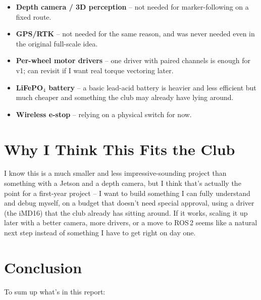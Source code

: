 \documentclass[12pt,a4paper]{article}
\begin{document}
\begin{itemize}
    \item \textbf{Depth camera / 3D perception} -- not needed for marker-following on a
    fixed route.
    \item \textbf{GPS/RTK} -- not needed for the same reason, and was never needed even
    in the original full-scale idea.
    \item \textbf{Per-wheel motor drivers} -- one driver with paired channels is enough
    for v1; can revisit if I want real torque vectoring later.
    \item \textbf{LiFePO$_4$ battery} -- a basic lead-acid battery is heavier and less
    efficient but much cheaper and something the club may already have lying around.
    \item \textbf{Wireless e-stop} -- relying on a physical switch for now.
\end{itemize}

\section{Why I Think This Fits the Club}

I know this is a much smaller and less impressive-sounding project than something with a
Jetson and a depth camera, but I think that's actually the point for a first-year
project -- I want to build something I can fully understand and debug myself, on a budget
that doesn't need special approval, using a driver (the iMD16) that the club already has
sitting around. If it works, scaling it up later with a better camera, more drivers, or a
move to ROS\,2 seems like a natural next step instead of something I have to get right on
day one.

\section{Conclusion}

To sum up what's in this report:
\end{document}
